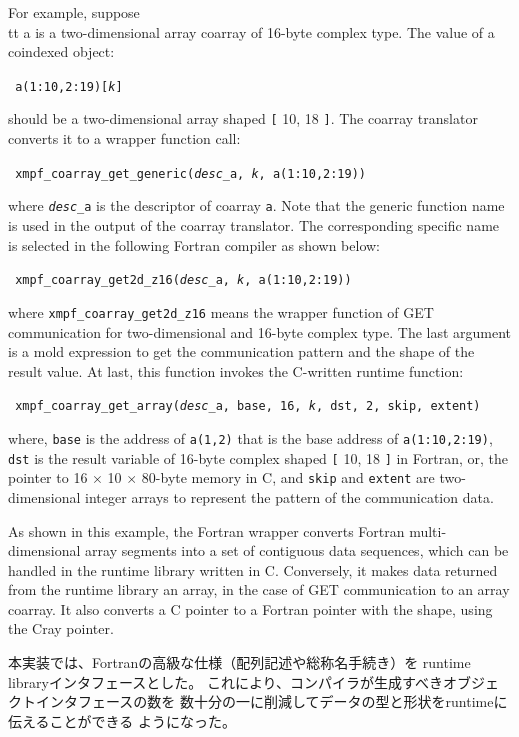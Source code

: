 For example, suppose {\\tt a} is a two-dimensional array coarray of 
16-byte complex type. The value of a coindexed object:
\begin{center}\tt
a(1:10,2:19)[{\it k}]
\end{center}
should be a two-dimensional array shaped {\tt [} 10, 18 {\tt ]}. 
The coarray translator converts it to a wrapper function call:
\begin{center}\tt
xmpf\_coarray\_get\_generic({\it desc\_}a, {\it k}, a(1:10,2:19))
\end{center}
where {\tt{\it desc\_}a} is the descriptor of coarray {\tt a}.
Note that the generic function name is used in the output of the coarray
translator. The corresponding specific name is selected in the 
following Fortran compiler as shown below:
\begin{center}\tt
xmpf\_coarray\_get2d\_z16({\it desc\_}a, {\it k}, a(1:10,2:19))
\end{center}
where {\tt xmpf\_coarray\_get2d\_z16} means the wrapper function
of GET communication for two-dimensional and 16-byte complex type.
The last argument is a mold expression to get the communication pattern 
and the shape of the result value.
At last, this function invokes the C-written runtime function:
\begin{center}\tt
xmpf\_coarray\_get\_array({\it desc\_}a,\,base,\,16,\,{\it k},\,dst,\,2,\,skip,\,extent)
\end{center}
where, 
%
{\tt base} is the address of {\tt a(1,2)} that is the base address of {\tt a(1:10,2:19)},
%
{\tt dst} is the result variable of 16-byte complex shaped {\tt [} 10, 18 {\tt ]}
in Fortran, or, the pointer to 16 $\times$ 10 $\times$ 80-byte memory in C, and
%
{\tt skip} and {\tt extent} are two-dimensional integer arrays to represent 
the pattern of the communication data.

As shown in this example,
the Fortran wrapper converts Fortran multi-dimensional array segments 
into a set of contiguous data sequences, which can be handled in the runtime
library written in C.
Conversely, it makes data returned from the runtime library an array, 
in the case of GET communication to an array coarray.
It also converts a C pointer to a Fortran pointer with the shape, using
the Cray pointer.

本実装では、Fortranの高級な仕様（配列記述や総称名手続き）を
runtime libraryインタフェースとした。
これにより、コンパイラが生成すべきオブジェクトインタフェースの数を
数十分の一に削減してデータの型と形状をruntimeに伝えることができる
ようになった。

